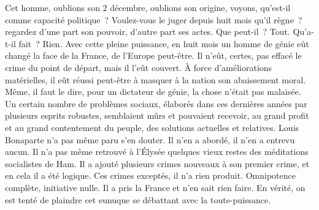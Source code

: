 \documentclass[french,twoside]{book} %
\begin{document}
\noindent Cet homme, oublions son 2 décembre, oublions son origine, voyons, qu’est-il comme capacité politique ? Voulez-vous le juger depuis huit mois qu’il règne ? regardez d’une part son pouvoir, d’autre part ses actes. Que peut-il ? Tout. Qu’a-t-il fait ? Rien. Avec cette pleine puissance, en huit mois un homme de génie eût changé la face de la France, de l’Europe peut-être. Il n’eût, certes, pas effacé le crime du point de départ, mais il l’eût couvert. À force d’améliorations matérielles, il eût réussi peut-être à masquer à la nation son abaissement moral. Même, il faut le dire, pour un dictateur de génie, la chose n’était pas malaisée. Un certain nombre de problèmes sociaux, élaborés dans ces dernières années par plusieurs esprits robustes, semblaient mûrs et pouvaient recevoir, au grand profit et au grand contentement du peuple, des solutions actuelles et relatives. Louis Bonaparte n’a pas même paru s’en douter. Il n’en a abordé, il n’en a entrevu aucun. Il n’a pas même retrouvé à l’Élysée quelques vieux restes des méditations socialistes de Ham. Il a ajouté plusieurs crimes nouveaux à son premier crime, et en cela il a été logique. Ces crimes exceptés, il n’a rien produit. Omnipotence complète, initiative nulle. Il a pris la France et n’en sait rien faire. En vérité, on est tenté de plaindre cet eunuque se débattant avec la toute-puissance.\par
\end{document}
